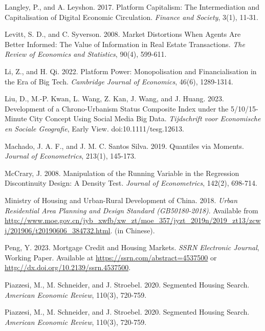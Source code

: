 \documentclass[11pt]{article}
\begin{document}
\begin{singlespace}
\begin{thebibliography}{}
Langley, P., and A. Leyshon. 2017. Platform Capitalism: The Intermediation and Capitalisation of Digital Economic Circulation. \textit{Finance and Society}, 3(1), 11-31. 

Levitt, S. D., and C. Syverson. 2008. Market Distortions When Agents Are Better Informed: The Value of Information in Real Estate Transactions. \textit{The Review of Economics and Statistics}, 90(4), 599-611. 

Li, Z., and H. Qi. 2022. Platform Power: Monopolisation and Financialisation in the Era of Big Tech. \textit{Cambridge Journal of Economics}, 46(6), 1289-1314. 

Liu, D., M.-P. Kwan, L. Wang, Z. Kan, J. Wang, and J. Huang. 2023. Development of a Chrono-Urbanism Status Composite Index under the 5/10/15-Minute City Concept Using Social Media Big Data. \textit{Tijdschrift voor Economische en Sociale Geografie}, Early View. doi:10.1111/tesg.12613.

Machado, J. A. F., and J. M. C. Santos Silva. 2019. Quantiles via Moments. \textit{Journal of Econometrics}, 213(1), 145-173. 

McCrary, J. 2008. Manipulation of the Running Variable in the Regression Discontinuity Design: A Density Test. \textit{Journal of Econometrics}, 142(2), 698-714. 

Ministry of Housing and Urban-Rural Development of China. 2018. \textit{Urban Residential Area Planning and Design Standard (GB50180-2018)}. Available from \url{http://www.moe.gov.cn/jyb_xwfb/xw_zt/moe_357/jyzt_2019n/2019_zt13/zcwj/201906/t20190606_384732.html}. (in Chinese). 

Peng, Y. 2023. Mortgage Credit and Housing Markets. \textit{SSRN Electronic Journal}, Working Paper. Available at \url{https://ssrn.com/abstract=4537500} or \url{http://dx.doi.org/10.2139/ssrn.4537500}. 

Piazzesi, M., M. Schneider, and J. Stroebel. 2020. Segmented Housing Search. \textit{American Economic Review}, 110(3), 720-759. 

Piazzesi, M., M. Schneider, and J. Stroebel. 2020. Segmented Housing Search. \textit{American Economic Review}, 110(3), 720-759. 


\end{thebibliography}
\end{singlespace}
\end{document}
